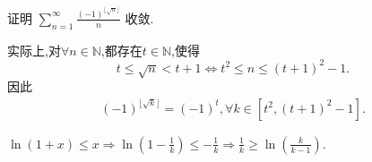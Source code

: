 \documentclass[../../main.tex]{subfiles}
\begin{document}
\begin{example}
证明 $\sum_{n=1}^{\infty} \frac{(-1)^{\lfloor \sqrt{n} \rfloor}}{n}$ 收敛.
\end{example}
\begin{remark}
实际上,对$\forall n\in \mathbb{N}$,都存在$t\in \mathbb{N}$,使得$$t\leqslant \sqrt{n}<t+1\iff t^2\leqslant n\leqslant (t+1)^2-1.$$
因此
\begin{align*}
(-1)^{\lfloor \sqrt{k} \rfloor}=(-1)^t,\forall k\in [t^2,(t+1)^2-1].
\end{align*}
\end{remark}
\begin{remark}
$\ln \left( 1+x \right) \leqslant x\Rightarrow \ln \left( 1-\frac{1}{k} \right) \leqslant -\frac{1}{k}\Rightarrow \frac{1}{k}\geqslant \ln \left( \frac{k}{k-1} \right) .$
\end{remark}
\end{document}
